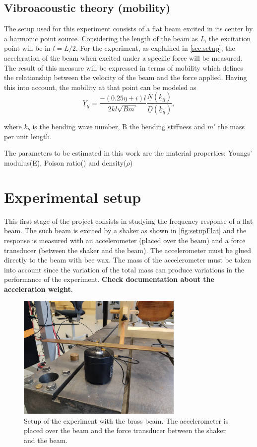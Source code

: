 \documentclass{article}
\begin{document}
\subsection{Vibroacoustic theory (mobility)}
\label{sec:theory}
The setup used for this experiment consists of a flat beam excited in its center by a harmonic point source. Considering the length of the beam as \textit{L}, the excitation point will be in $l = L/2$. For the experiment, as explained in \autoref{sec:setup}, the acceleration of the beam when excited under a specific force will be measured. The result of this measure will be expressed in terms of mobility which defines the relationship between the velocity of the beam and the force applied.  Having this into account, the mobility at that point can be modeled as
\begin{equation}
    \underline{Y}_{l l}=\frac{-(0.25 \eta+i) l}{2 k l \sqrt{B m^{\prime}} } \frac{ \underline{N}(\underline{k}_{l l})}{\underline{D}(\underline{k}_{l l})},
\end{equation}

where $k_b$ is the bending wave number, B the bending stiffness and  $m'$ the mass per unit length. 

The parameters to be estimated in this work are the material properties: Youngs' modulus(E), Poison ratio() and density($\rho$)

\section{Experimental setup}
\label{sec:setup}
This first stage of the project consists in studying the frequency response of a flat beam. The such beam is excited by a shaker as shown in \autoref{fig:setupFlat} and the response is measured with an accelerometer (placed over the beam) and a force transducer (between the shaker and the beam). The accelerometer must be glued directly to the beam with bee wax. The mass of the accelerometer must be taken into account since the variation of the total mass can produce variations in the  performance of the experiment. \textbf{Check documentation about the acceleration weight}. 

\begin{figure}[h]
    \centering
    \includegraphics[width = 8cm]{pictures/expSetup.jpeg}
    \caption{Setup of the experiment with the brass beam. The accelerometer is placed over the beam and the force transducer between the shaker and the beam.}
    \label{fig:setupFlat}
\end{figure}
\end{document}
